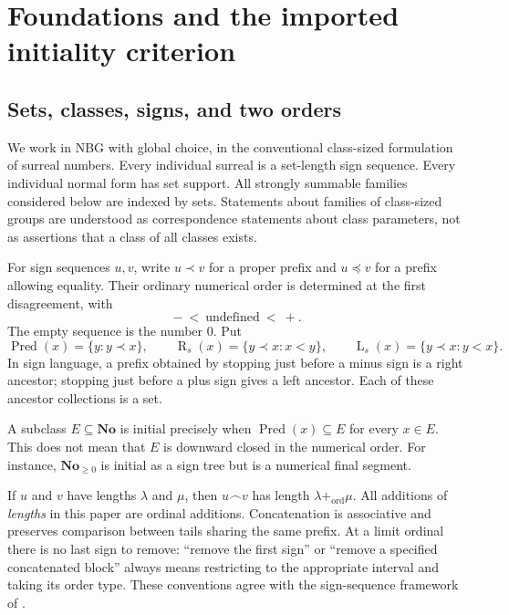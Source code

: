 \documentclass[11pt]{article}
\theoremstyle{definition}
\theoremstyle{remark}
\newcommand{\No}{\ensuremath{\mathbf{No}}}
\newcommand{\Pred}{\operatorname{Pred}}
\newcommand{\Rs}{\operatorname{R}_{s}}
\newcommand{\Ls}{\operatorname{L}_{s}}
\newcommand{\cat}{\mathbin{\frown}}
\newcommand{\pr}{\mathrel{\prec}}
\newcommand{\pre}{\mathrel{\preccurlyeq}}
\begin{document}
\section{Foundations and the imported initiality criterion}\label{isg:sec:background}

\subsection{Sets, classes, signs, and two orders}
We work in NBG with global choice, in the conventional class-sized
formulation of surreal numbers. Every individual surreal is a
set-length sign sequence. Every individual normal form has set support.
All strongly summable families considered below are indexed by sets.
Statements about families of class-sized groups are understood as
correspondence statements about class parameters, not as assertions that
a class of all classes exists.

For sign sequences $u,v$, write $u\pr v$ for a proper prefix and
$u\pre v$ for a prefix allowing equality. Their ordinary numerical order
is determined at the first disagreement, with
\[
 -\ <\ \text{undefined}\ <\ +.
\]
The empty sequence is the number $0$. Put
\[
 \Pred(x)=\{y:y\pr x\},\qquad
 \Rs(x)=\{y\pr x:x<y\},\qquad
 \Ls(x)=\{y\pr x:y<x\}.
\]
In sign language, a prefix obtained by stopping just before a minus sign
is a right ancestor; stopping just before a plus sign gives a left
ancestor. Each of these ancestor collections is a set.

A subclass $E\subseteq\No$ is initial precisely when
$\Pred(x)\subseteq E$ for every $x\in E$. This does not mean that $E$
is downward closed in the numerical order. For instance, $\No_{\ge0}$
is initial as a sign tree but is a numerical final segment.

If $u$ and $v$ have lengths $\lambda$ and $\mu$, then
$u\cat v$ has length $\lambda+_{\mathrm{ord}}\mu$. All additions of
\emph{lengths} in this paper are ordinal additions. Concatenation is
associative and preserves comparison between tails sharing the same
prefix. At a limit ordinal there is no last sign to remove: ``remove the
first sign'' or ``remove a specified concatenated block'' always means
restricting to the appropriate interval and taking its order type.
These conventions agree with the sign-sequence framework of
\cite{BagHoeven}.
\end{document}
